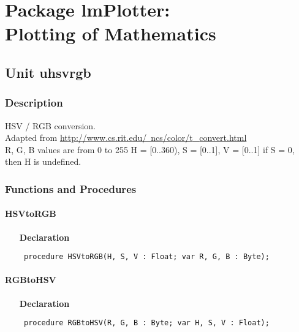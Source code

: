 \documentclass[12pt,a4paper,oneside]{report}
\newcommand{\declarationitem}[1]{\textbf{#1}}
\newcommand{\code}[1]{\texttt{#1}}
\begin{document}
\chapter[Package lmPlotter]{Package lmPlotter: \\ Plotting of Mathematics}\label{package-lmPlotter}
\section{Unit uhsvrgb}
\label{uhsvrgb}
\subsection{Description}
HSV / RGB conversion. \\ 
Adapted from \href{http://www.cs.rit.edu/~ncs/color/t_convert.html}{http://www.cs.rit.edu/~ncs/color/t{\_}convert.html} \\ R, G, B values are from 0 to 255 H = [0..360), S = [0..1], V = [0..1] if S = 0, then H is undefined. 
\subsection{Functions and Procedures}
\subsubsection{HSVtoRGB}
\label{uhsvrgb-HSVtoRGB}
\begin{itemize}\item[\declarationitem{Declaration}\hfill]
	\begin{flushleft}
		\code{
			procedure HSVtoRGB(H, S, V : Float; var R, G, B : Byte);}
		
	\end{flushleft}
	
\end{itemize}
\subsubsection{RGBtoHSV}
\label{uhsvrgb-RGBtoHSV}
\begin{itemize}\item[\declarationitem{Declaration}\hfill]
	\begin{flushleft}
		\code{
			procedure RGBtoHSV(R, G, B : Byte; var H, S, V : Float);}
		
	\end{flushleft}
	
\end{itemize}
\end{document}
